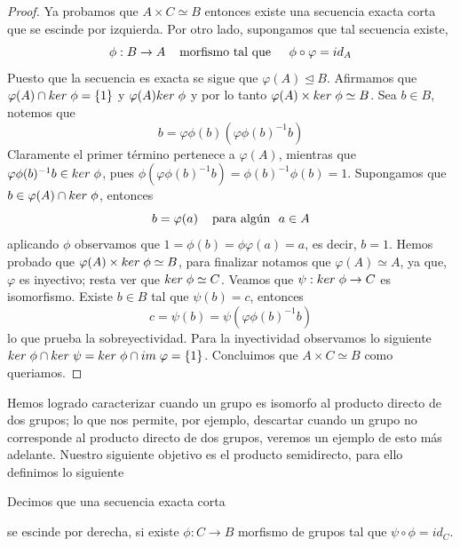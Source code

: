 \documentclass[11pt]{article}
\begin{document}
\newpage
\begin{proof}
    Ya probamos que $A\times C\simeq B$ entonces existe una secuencia exacta corta que se escinde 
    por izquierda. Por otro lado, supongamos que tal secuencia existe, 
    \begin{equation*}
        \phi:B\to A \hspace{4mm}\text{morfismo tal que }\hspace{4mm} \phi\circ\varphi=id_{A}
    \end{equation*}
    Puesto que la secuencia es exacta se sigue que $\varphi(A)\unlhd B$. Afirmamos que 
    $\varphi(A)\cap ker\hspace{1mm}\phi=\{1\}$ y $\varphi(A)ker\hspace{1mm}\phi$ y por lo tanto 
    $\varphi(A)\times ker\hspace{1mm}\phi\simeq B$. Sea $b\in B$, notemos que
    \begin{equation*}
        b=\varphi\phi(b)(\varphi\phi(b)^{-1}b)
    \end{equation*}
    Claramente el primer término pertenece a $\varphi(A)$, mientras que 
    $\varphi\phi(b)^{-1}b\in ker\hspace{1mm}\phi$, pues $\phi(\varphi\phi(b)^{-1}b)=\phi(b)^{-1}\phi(b)=1$. 
    Supongamos que $b\in \varphi(A)\cap ker\hspace{1mm}\phi$, entonces
    \begin{equation*}
        b=\varphi(a) \htext{para algún }a\in A
    \end{equation*}
    aplicando $\phi$ observamos que $1=\phi(b)=\phi\varphi(a)=a$, es decir, $b=1$. Hemos probado
    que $\varphi(A)\times ker\hspace{1mm}\phi\simeq B$, para finalizar notamos que $\varphi(A)\simeq A$, ya 
    que, $\varphi$ es inyectivo; resta ver que $ker\hspace{1mm}\phi\simeq C$. Veamos que 
    $\psi:ker\hspace{1mm}\phi\to C$ es isomorfismo. Existe $b\in B$ tal que $\psi(b)=c$, entonces
    \begin{equation*}
        c=\psi(b)=\psi(\varphi\phi(b)^{-1}b)
    \end{equation*}
    lo que prueba la sobreyectividad. Para la inyectividad observamos lo siguiente
    $ker\hspace{1mm}\phi\cap ker\hspace{1mm}\psi=ker\hspace{1mm}\phi\cap im\hspace{1mm}\varphi=\{1\}$. Concluimos que $A\times C\simeq B$
    como queriamos.
\end{proof}

\noindent Hemos logrado caracterizar cuando un grupo es isomorfo al producto directo de dos 
grupos; lo que nos permite, por ejemplo, descartar cuando un grupo no corresponde al producto
directo de dos grupos, veremos un ejemplo de esto más adelante. Nuestro siguiente objetivo es el
producto semidirecto, para ello definimos lo siguiente

\begin{dfn}
    Decimos que una secuencia exacta corta
    
    \centerline{
    } \vspace{2mm}
    se escinde por derecha, si existe $\phi:C\to B$ morfismo de grupos tal que 
    $\psi\circ\phi=id_{C}$.
\end{dfn}
\end{document}
